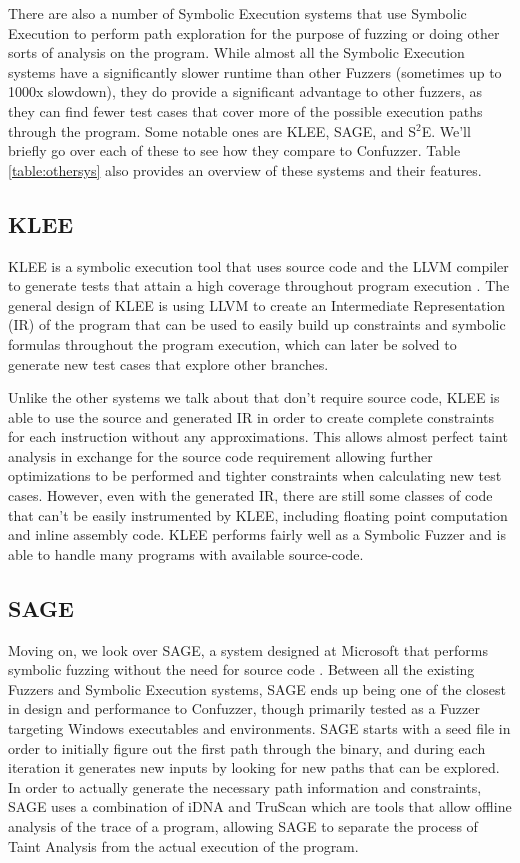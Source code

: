 There are also a number of Symbolic Execution systems that use Symbolic
Execution to perform path exploration for the purpose of fuzzing or doing other
sorts of analysis on the program. While almost all the Symbolic Execution
systems have a significantly slower runtime than other Fuzzers (sometimes up to
1000x slowdown), they do provide a significant advantage to other fuzzers, as
they can find fewer test cases that cover more of the possible execution paths
through the program. Some notable ones are KLEE, SAGE, and S$^2$E. We'll briefly go
over each of these to see how they compare to Confuzzer. Table
\ref{table:othersys} also provides an overview of these systems and their
features.

\subsection{KLEE}
KLEE is a symbolic execution tool that uses source code and the LLVM compiler to
generate tests that attain a high coverage throughout program execution
\cite{klee}. The general design of KLEE is using LLVM to create an Intermediate
Representation (IR) of the program that can be used to easily build up constraints
and symbolic formulas throughout the program execution, which can later be
solved to generate new test cases that explore other branches.

Unlike the other systems we talk about that don't require source code, KLEE is
able to use the source and generated IR in order to create complete constraints
for each instruction without any approximations. This allows almost perfect
taint analysis in exchange for the source code requirement allowing further
optimizations to be performed and tighter constraints when calculating new test
cases. However, even with the generated IR, there are still some classes of code
that can't be easily instrumented by KLEE, including floating point computation
and inline assembly code. KLEE performs fairly well as a Symbolic Fuzzer and is
able to handle many programs with available source-code.

\subsection{SAGE}
Moving on, we look over SAGE, a system designed at Microsoft that performs
symbolic fuzzing without the need for source code \cite{sage}. Between
all the existing Fuzzers and Symbolic Execution systems, SAGE ends up being one
of the closest in design and performance to Confuzzer, though primarily tested
as a Fuzzer targeting Windows executables and environments. SAGE starts with a
seed file in order to initially figure out the first path through the binary,
and during each iteration it generates new inputs by looking for new paths that
can be explored. In order to actually generate the necessary path information
and constraints, SAGE uses a combination of iDNA and TruScan which are tools
that allow offline analysis of the trace of a program, allowing SAGE to separate
the process of Taint Analysis from the actual execution of the program.

